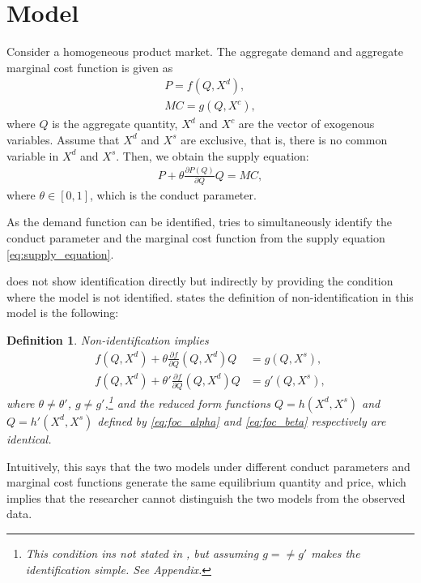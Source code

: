 \documentclass[11pt, a4paper]{article}
\newtheorem{definition}{Definition}
\theoremstyle{remark}
\begin{document}
\section{Model}
Consider a homogeneous product market.
The aggregate demand and aggregate marginal cost function is given as
\begin{align}
    P = f(Q, X^{d}), \label{eq:demand}
    \\
    MC = g(Q, X^{c}),\label{eq:marginal_cost}
\end{align}
where $Q$ is the aggregate quantity, $X^{d}$ and $X^{c}$ are the vector of exogenous variables.
Assume that $X^{d}$ and $X^{s}$ are exclusive, that is, there is no common variable in $X^{d}$ and $X^{s}$.
Then, we obtain the supply equation:
\begin{align}
     P + \theta\frac{\partial P(Q)}{\partial Q}Q = MC,\label{eq:supply_equation}
\end{align}
where $\theta\in[0,1]$, which is the conduct parameter.

As the demand function can be identified, \citet{lau1982identifying} tries to simultaneously identify the conduct parameter and the marginal cost function from the supply equation \eqref{eq:supply_equation}.

\citet{lau1982identifying} does not show identification directly but indirectly by providing the condition where the model is not identified.
\citet{lau1982identifying} states the definition of non-identification in this model is the following:
\begin{definition}\label{def:non_identification}
    Non-identification implies
    \begin{align}
    f(Q, X^{d}) + \theta \frac{\partial f}{\partial Q}(Q, X^{d})Q &= g(Q, X^{s}),\label{eq:foc_alpha}\\
    f(Q, X^{d}) + \theta' \frac{\partial f}{\partial Q}(Q, X^{d})Q &= g'(Q, X^{s}), \label{eq:foc_beta}
    \end{align}
    where $\theta \neq \theta'$, $g \ne g'$,\footnote{This condition ins not stated in \citet{lau1982identifying}, but assuming $g =\ne g'$ makes the identification simple. See Appendix.} and the reduced form functions $Q = h(X^{d}, X^{s})$ and $Q = h'(X^{d}, X^{s})$ defined by \eqref{eq:foc_alpha} and \eqref{eq:foc_beta} respectively are identical.
\end{definition}
Intuitively, this says that the two models under different conduct parameters and marginal cost functions generate the same equilibrium quantity and price, which implies that the researcher cannot distinguish the two models from the observed data.
\end{document}
